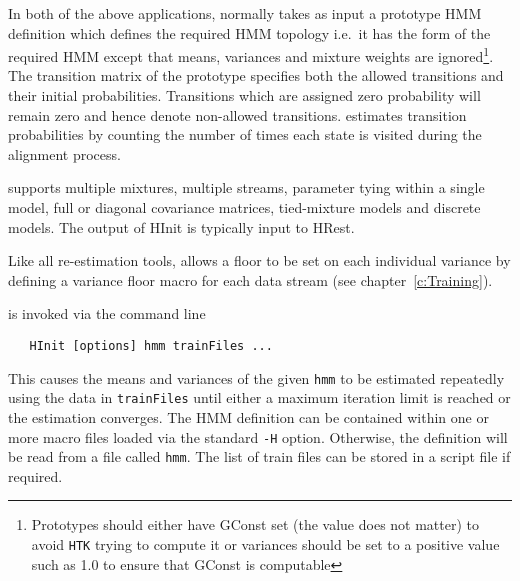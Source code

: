 In both of the above applications,  normally takes 
as input a prototype
HMM definition which defines the required HMM topology i.e.\ it has
the form of the required HMM except that means, variances and mixture
weights are ignored\footnote{Prototypes should either
have GConst set (the value does
not matter) to avoid {\tt HTK} trying to compute it or
variances should be set to a positive value such as 1.0 to
ensure that GConst is computable}.  The
transition matrix of the prototype specifies both the allowed
transitions and their initial probabilities.  Transitions which
are assigned zero probability will remain zero and hence denote
non-allowed transitions.   estimates transition probabilities
by counting the number of times each state is visited during
the alignment process.

 supports multiple mixtures, multiple streams,
parameter tying within a single model, full or diagonal
covariance matrices, tied-mixture models and discrete models.  
The output of HInit is typically input to HRest.

Like all re-estimation tools,  allows a floor to  be set on
each individual variance by defining a variance floor macro for each
data stream (see chapter~\ref{c:Training}).
 

 is invoked via the command line
\begin{verbatim}
   HInit [options] hmm trainFiles ...
\end{verbatim}
This causes the means and variances of the given {\tt hmm} to be
estimated repeatedly using the data in {\tt trainFiles} 
until either a maximum iteration limit is reached
or the estimation converges.
The HMM definition can be contained within one or more macro
files loaded via the standard \texttt{-H} option.  Otherwise, the 
definition will be read from a file called \texttt{hmm}.
The list of train files can be stored in a script file if required.


